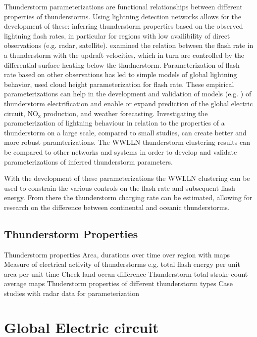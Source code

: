 Thunderstorm parameterizations are functional relationships between different properties of thunderstorms.
Using lightning detection networks allows for the development of these: inferring thunderstorm properties based on the observed lightning flash rates, in particular for regions with low availibility of direct observations (e.g. radar, satellite).
\citet{Zipser1994} examined the relation between the flash rate in a thunderstorm with the updraft velocities, which in turn are controlled by the differential surface heating below the thudnerstorm.
Parameterization of flash rate based on other observations has led to simple models of global lightning behavior, \citet{Price1992} used cloud height parameterization for flash rate.
These empirical parameterizations can help in the development and validation of models (e.g. \citet{Baker1999}) of thunderstorm electrification and enable or expand prediction of the global electric circuit, NO$_\text{x}$ production, and weather forecasting.
Investigating the parameterization of lightning behaviour in relation to the properties of a thunderstorm on a large scale, compared to small studies, can create better and more robust paramterizations.
The WWLLN thunderstorm clustering results can be compared to other networks and systems in order to develop and validate parameterizations of inferred thunderstorm parameters.

With the development of these parameterizations the WWLLN clustering can be used to constrain the various controls on the flash rate and subsequent flash energy.
From there the thunderstorm charging rate can be estimated, allowing for research on the difference between continental and oceanic thunderstorms.

\subsection{Thunderstorm Properties}

 Thunderstorm properties
  Area, durations over time over region with maps
  Measure of electrical activity of thunderstorms
     e.g. total flash energy per unit area per unit time
     Check land-ocean difference
  Thunderstorm total stroke count average maps
  Thuderstorm properties of different thunderstorm types
  Case studies with radar data for parameterization

\section{Global Electric circuit}

